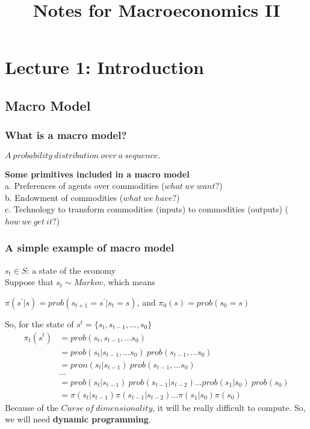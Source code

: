 \documentclass{article}
\title{Notes for Macroeconomics II}
\begin{document}
\maketitle
\newpage
\tableofcontents


\newpage
\section{Lecture 1: Introduction}%

\subsection{Macro Model}

\subsubsection{What is a macro model?}
\centerline{$A\ probability\ distribution\ over\ a\ sequence.$}
\textbf{Some primitives included in a macro model}\\
a. Preferences of agents over commodities ($what\ we\ want?$)\\
b. Endowment of commodities ($what\ we\ have?$)\\
c. Technology to transform commodities (inputs) to commodities (outputs) ($how\ we\ get\ it?$)

\subsubsection{A simple example of macro model}
$s_t \in S$: a state of the economy\\
Suppose that $s_t \sim Markov$, which means\\
\centerline{$\pi(s^\prime | s) = prob(s_{t + 1} = s^\prime | s_t = s)$, and $\pi_0(s) = prob(s_0 = s)$}
So, for the state of $s^t = \{s_t, s_{t-1}, \ldots, s_0\}$
\begin{align*}
	\pi_t(s^t) &= prob(s_t, s_{t-1}, \ldots s_0)	\\
	&= prob(s_t | s_{t-1}, \ldots s_0)\ prob(s_{t-1}, \ldots s_0)\\
	&= pron(s_t | s_{t-1})\ prob(s_{t-1}, \ldots s_0)\\
	&\ldots\\
	&= prob(s_t | s_{t-1})\ prob(s_{t-1} | s_{t-2})\ldots prob(s_1 | s_0)\ prob(s_0)\\
	&= \pi(s_t | s_{t-1})\pi(s_{t-1} | s_{t-2})\ldots \pi(s_1 | s_0)\pi(s_0)
\end{align*}
Because of the $Curse\ of\ dimensionality$, it will be really difficult to compute. So, we will need \textbf{dynamic programming}.
\end{document}
